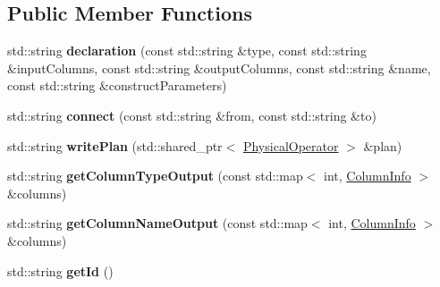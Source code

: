 \subsection*{Public Member Functions}
\begin{DoxyCompactItemize}
\item 
\hypertarget{class_bobox_plan_writing_physical_operator_visitor_a67767e3ad079b9fd8d431c230aed3f73}{std\+::string {\bfseries declaration} (const std\+::string \&type, const std\+::string \&input\+Columns, const std\+::string \&output\+Columns, const std\+::string \&name, const std\+::string \&construct\+Parameters)}\label{class_bobox_plan_writing_physical_operator_visitor_a67767e3ad079b9fd8d431c230aed3f73}

\item 
\hypertarget{class_bobox_plan_writing_physical_operator_visitor_a9dc928a4e3a478c260036bbc44daf302}{std\+::string {\bfseries connect} (const std\+::string \&from, const std\+::string \&to)}\label{class_bobox_plan_writing_physical_operator_visitor_a9dc928a4e3a478c260036bbc44daf302}

\item 
\hypertarget{class_bobox_plan_writing_physical_operator_visitor_ad19fe61538f80b821617614a31e30cb2}{std\+::string {\bfseries write\+Plan} (std\+::shared\+\_\+ptr$<$ \hyperlink{class_physical_operator}{Physical\+Operator} $>$ \&plan)}\label{class_bobox_plan_writing_physical_operator_visitor_ad19fe61538f80b821617614a31e30cb2}

\item 
\hypertarget{class_bobox_plan_writing_physical_operator_visitor_a09857e8ac9d485ca1a749e06fd447a4a}{std\+::string {\bfseries get\+Column\+Type\+Output} (const std\+::map$<$ int, \hyperlink{class_column_info}{Column\+Info} $>$ \&columns)}\label{class_bobox_plan_writing_physical_operator_visitor_a09857e8ac9d485ca1a749e06fd447a4a}

\item 
\hypertarget{class_bobox_plan_writing_physical_operator_visitor_ab10127e63906b7eb061f703cd7bb9252}{std\+::string {\bfseries get\+Column\+Name\+Output} (const std\+::map$<$ int, \hyperlink{class_column_info}{Column\+Info} $>$ \&columns)}\label{class_bobox_plan_writing_physical_operator_visitor_ab10127e63906b7eb061f703cd7bb9252}

\item 
\hypertarget{class_bobox_plan_writing_physical_operator_visitor_aa41f0bb800a4584a5d2baa160f3b064a}{std\+::string {\bfseries get\+Id} ()}\label{class_bobox_plan_writing_physical_operator_visitor_aa41f0bb800a4584a5d2baa160f3b064a}


\end{DoxyCompactItemize}
